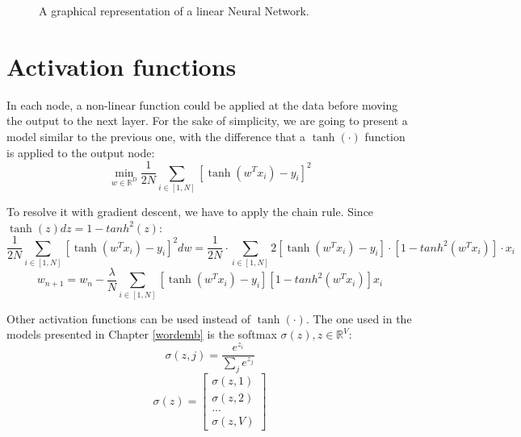 \begin{figure}[h]
    \centering
    \caption{A graphical representation of a linear Neural Network.}
    \label{fig:nn-linear}
\end{figure}

\section{Activation functions}
In each node, a non-linear function could be applied at the data before moving the output to the next layer.
For the sake of simplicity, we are going to present a model similar to the previous one,
with the difference that a $\tanh(\cdot)$ function is applied to the output node:
$$ \displaystyle \min_{w \in \mathbb{R}^D} \frac{1}{2N} \sum_{i \in [1, N]} [\tanh(w^T x_i) - y_i]^2 $$

To resolve it with gradient descent, we have to apply the chain rule.
Since $\tanh(z) dz = 1 - tanh^2(z)$:
$$ \frac{1}{2N} \sum_{i \in [1, N]} [\tanh(w^T x_i) - y_i]^2 dw =
    \frac{1}{2N} \cdot \sum_{i \in [1, N]} 2[\tanh(w^T x_i) - y_i] \cdot [1 - tanh^2(w^T x_i)] \cdot x_i $$
$$ w_{n+1} = w_n -
    \frac{\lambda}{N} \sum_{i \in [1, N]} [\tanh(w^T x_i) - y_i] [1 - tanh^2(w^T x_i)] x_i $$

Other activation functions can be used instead of $\tanh(\cdot)$.
The one used in the models presented in Chapter \ref{wordemb} is the softmax
$\sigma(z), z \in \mathbb{R}^V$:
$$\sigma(z, j) =  \frac{e^{z_i}}{\sum_j e^{z_j}}$$
$$ \sigma(z) =
    \begin{bmatrix}
        \sigma(z, 1) \\ \sigma(z, 2) \\ ... \\ \sigma(z, V)
    \end{bmatrix}
$$

